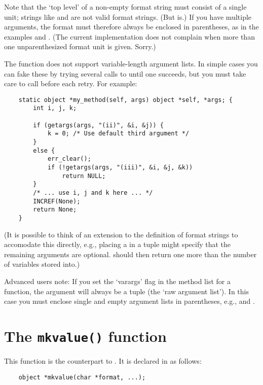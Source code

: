 Note that the `top level' of a non-empty format string must consist of
a single unit; strings like  and  are not valid
format strings.  (But  is.)  If you have multiple arguments,
the format must therefore always be enclosed in parentheses, as in the
examples  and .  (The current
implementation does not complain when more than one unparenthesized
format unit is given.  Sorry.)

The  function does not support variable-length
argument lists.  In simple cases you can fake these by trying several
calls to
 until one succeeds, but you must take care to call
 before each retry.  For example:

\begin{verbatim}
    static object *my_method(self, args) object *self, *args; {
        int i, j, k;

        if (getargs(args, "(ii)", &i, &j)) {
            k = 0; /* Use default third argument */
        }
        else {
            err_clear();
            if (!getargs(args, "(iii)", &i, &j, &k))
                return NULL;
        }
        /* ... use i, j and k here ... */
        INCREF(None);
        return None;
    }
\end{verbatim}

(It is possible to think of an extension to the definition of format
strings to accomodate this directly, e.g., placing a \samp{|} in a
tuple might specify that the remaining arguments are optional.
 should then return one more than the number of
variables stored into.)

Advanced users note: If you set the `varargs' flag in the method list
for a function, the argument will always be a tuple (the `raw argument
list').  In this case you must enclose single and empty argument lists
in parentheses, e.g.,  and \samp{()}.


\section{The {\tt mkvalue()} function}

This function is the counterpart to .  It is declared
in  as follows:

\begin{verbatim}
    object *mkvalue(char *format, ...);
\end{verbatim}

